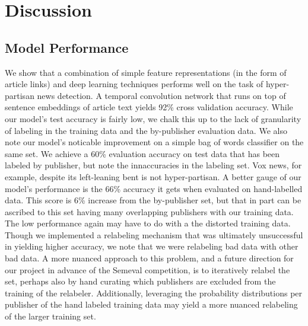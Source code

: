 \documentclass[11pt,a4paper]{article}
\begin{document}
\section{Discussion}

\subsection{Model Performance}
We show that a combination of simple feature representations (in the form of article links) and deep learning techniques performs well on the task of hyper-partisan news detection. A temporal convolution network that runs on top of sentence embeddings of article text yields 92\% cross validation accuracy. While our model's test accuracy is fairly low, we chalk this up to the lack of granularity of labeling in the training data and the by-publisher evaluation data. We also note our model's noticable improvement on a simple bag of words classifier on the same set. We achieve a 60\% evaluation accuracy on test data that has been labeled by publisher, but note the innaccuracies in the labeling set. Vox news, for example, despite its left-leaning bent is not hyper-partisan. A better gauge of our model's performance is the 66\% accuracy it gets when evaluated on hand-labelled data. This score is 6\% increase from the by-publisher set, but that in part can be ascribed to this set having many overlapping publishers with our training data. The low performance again may have to do with a the distorted training data. Though we implemented a relabeling mechanism that was ultimately unsuccessful in yielding higher accuracy, we note that we were relabeling bad data with other bad data. A more nuanced approach to this problem, and a future direction for our project in advance of the Semeval competition, is to iteratively relabel the set, perhaps also by hand curating which publishers are excluded from the training of the relabeler. Additionally, leveraging the probability distributions per publisher of the hand labeled training data may yield a more nuanced relabeling of the larger training set.
\end{document}
